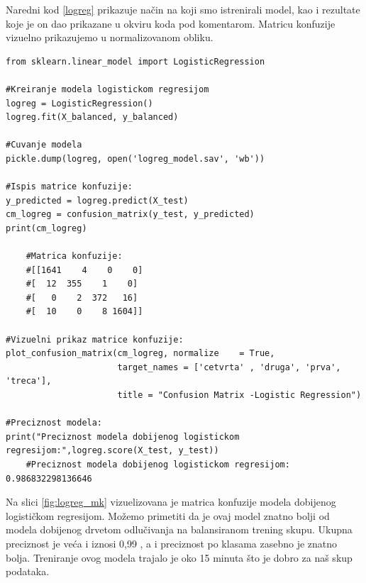 \documentclass[a4paper]{article}
\begin{document}
Naredni kod \ref{logreg} prikazuje način na koji smo istrenirali model, kao i rezultate koje je on dao prikazane u okviru koda pod komentarom. Matricu konfuzije vizuelno prikazujemo u normalizovanom obliku.
\\
\begin{lstlisting}[caption={Kreiranje modela logističkom regresijom i prikaz rezultata},frame=single, label=logreg]
from sklearn.linear_model import LogisticRegression

#Kreiranje modela logistickom regresijom
logreg = LogisticRegression()
logreg.fit(X_balanced, y_balanced)

#Cuvanje modela
pickle.dump(logreg, open('logreg_model.sav', 'wb'))

#Ispis matrice konfuzije:
y_predicted = logreg.predict(X_test)
cm_logreg = confusion_matrix(y_test, y_predicted)
print(cm_logreg)

	#Matrica konfuzije:
	#[[1641    4    0    0]
	#[  12  355    1    0]
	#[   0    2  372   16]
	#[  10    0    8 1604]]

#Vizuelni prikaz matrice konfuzije:
plot_confusion_matrix(cm_logreg, normalize    = True,
                      target_names = ['cetvrta' , 'druga', 'prva', 'treca'],
                      title = "Confusion Matrix -Logistic Regression")

#Preciznost modela:
print("Preciznost modela dobijenog logistickom regresijom:",logreg.score(X_test, y_test))
	#Preciznost modela dobijenog logistickom regresijom: 0.986832298136646
\end{lstlisting}

Na slici \ref{fig:logreg_mk} vizuelizovana je matrica konfuzije modela dobijenog logističkom regresijom. Možemo primetiti da je ovaj model znatno bolji od modela dobijenog drvetom odlučivanja na balansiranom trening skupu. Ukupna preciznost je veća i iznosi 0,99 , a i preciznost po klasama zasebno je znatno bolja. Treniranje ovog modela trajalo je oko 15 minuta što je dobro za naš skup podataka.
\end{document}
